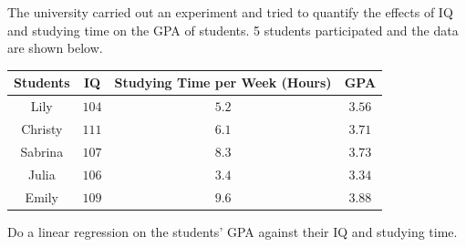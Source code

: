 \begin{exmp}
\label{exmp:GPAregress}
The university carried out an experiment and tried to quantify the effects of IQ and studying time on the GPA of students. 5 students participated and the data are shown below.
\begin{center}
\begin{tabular}{|c|c|c|c|}
\hline
Students & IQ & Studying Time per Week (Hours) & GPA \\
\hline
Lily & $104$ & $5.2$ & $3.56$ \\
\hline
Christy & $111$ & $6.1$ & $3.71$ \\
\hline
Sabrina & $107$ & $8.3$ & $3.73$ \\
\hline
Julia & $106$ & $3.4$ & $3.34$ \\
\hline
Emily & $109$ & $9.6$ & $3.88$ \\
\hline
\end{tabular}
\end{center} 
Do a linear regression on the students' GPA against their IQ and studying time.
\end{exmp}
